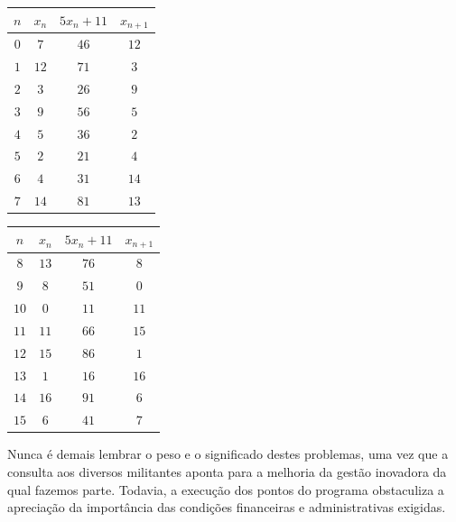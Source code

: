 \documentclass[fleqn]{profmat-cefet}
\begin{document}
\begin{multicols}{2} %
    \begin{center}
        \vspace{0.8\baselineskip}
        \begin{tabular}{cccc}
        	\hline
        	$n$ & $x_n$ & $5x_n+11$ & $x_{n+1}$ \\ \hline
        	$0$ &  $7$  &   $46$    &   $12$    \\
        	$1$ & $12$  &   $71$    &    $3$    \\
        	$2$ &  $3$  &   $26$    &    $9$    \\
        	$3$ &  $9$  &   $56$    &    $5$    \\
        	$4$ &  $5$  &   $36$    &    $2$    \\
        	$5$ &  $2$  &   $21$    &    $4$    \\
        	$6$ &  $4$  &   $31$    &   $14$    \\
        	$7$ & $14$  &   $81$    &   $13$    \\ \hline
        \end{tabular}
    \end{center}
    \begin{center}
        \vspace{0.8\baselineskip}
        \begin{tabular}{cccc}
        	\hline
        	$n$  & $x_n$ & $5x_n+11$ & $x_{n+1}$ \\ \hline
        	$8$  & $13$  &   $76$    &    $8$    \\
        	$9$  &  $8$  &   $51$    &    $0$    \\
        	$10$ &  $0$  &   $11$    &   $11$    \\
        	$11$ & $11$  &   $66$    &   $15$    \\
        	$12$ & $15$  &   $86$    &    $1$    \\
        	$13$ &  $1$  &   $16$    &   $16$    \\
        	$14$ & $16$  &   $91$    &    $6$    \\
        	$15$ &  $6$  &   $41$    &    $7$    \\ \hline
        \end{tabular}
    \end{center}        
\end{multicols}

Nunca é demais lembrar o peso e o significado destes
problemas, uma vez que a consulta aos diversos militantes aponta para a melhoria
da gestão inovadora da qual fazemos parte. Todavia, a execução dos pontos do
programa obstaculiza a apreciação da importância das condições financeiras e
administrativas exigidas. 
\end{document}
